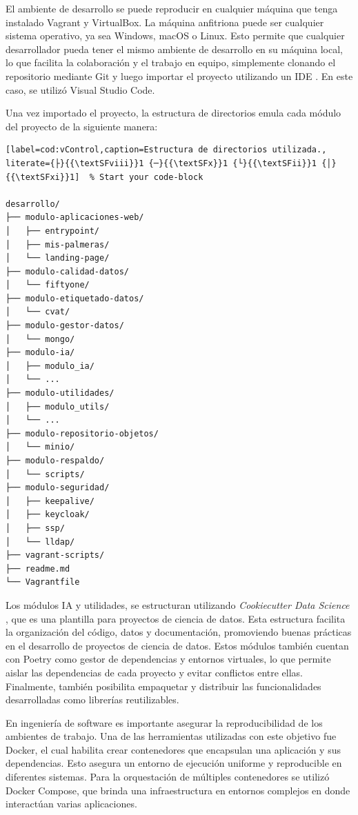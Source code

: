 El ambiente de desarrollo se puede reproducir en cualquier máquina que tenga instalado Vagrant y VirtualBox. La máquina anfitriona puede ser cualquier sistema operativo, ya sea Windows, macOS o Linux. Esto permite que cualquier desarrollador pueda tener el mismo ambiente de desarrollo en su máquina local, lo que facilita la colaboración y el trabajo en equipo, simplemente clonando el repositorio \citep{bruno_masoller_brunomaso1uba-ceia_nodate} mediante Git y luego importar el proyecto utilizando un IDE \citep{wikipedia_entorno_2025}. En este caso, se utilizó Visual Studio Code.

Una vez importado el proyecto, la estructura de directorios emula cada módulo del proyecto de la siguiente manera:

\begin{lstlisting}[label=cod:vControl,caption=Estructura de directorios utilizada., literate={├}{{\textSFviii}}1 {─}{{\textSFx}}1 {└}{{\textSFii}}1 {│}{{\textSFxi}}1]  % Start your code-block

desarrollo/
├── modulo-aplicaciones-web/
│   ├── entrypoint/ 
│   ├── mis-palmeras/
│   └── landing-page/
├── modulo-calidad-datos/
│   └── fiftyone/
├── modulo-etiquetado-datos/
│   └── cvat/
├── modulo-gestor-datos/
│   └── mongo/
├── modulo-ia/
│   ├── modulo_ia/
│   └── ...
├── modulo-utilidades/
│   ├── modulo_utils/
│   └── ...
├── modulo-repositorio-objetos/
│   └── minio/
├── modulo-respaldo/
│   └── scripts/
├── modulo-seguridad/
│   ├── keepalive/
│   ├── keycloak/
│   ├── ssp/
│   └── lldap/
├── vagrant-scripts/
├── readme.md
└── Vagrantfile

\end{lstlisting}

Los módulos IA y utilidades, se estructuran utilizando \textit{Cookiecutter Data Science} \citep{drivendata_cookiecutter_nodate}, que es una plantilla para proyectos de ciencia de datos. Esta estructura facilita la organización del código, datos y documentación, promoviendo buenas prácticas en el desarrollo de proyectos de ciencia de datos. Estos módulos también cuentan con Poetry \citep{eustace_poetry_nodate} como gestor de dependencias y entornos virtuales, lo que permite aislar las dependencias de cada proyecto y evitar conflictos entre ellas. Finalmente, también posibilita empaquetar y distribuir las funcionalidades desarrolladas como librerías reutilizables.

En ingeniería de software es importante asegurar la reproducibilidad de los ambientes de trabajo. Una de las herramientas utilizadas con este objetivo fue Docker, el cual habilita crear contenedores que encapsulan una aplicación y sus dependencias. Esto asegura un entorno de ejecución uniforme y reproducible en diferentes sistemas. Para la orquestación de múltiples contenedores se utilizó Docker Compose, que brinda una infraestructura en entornos complejos en donde interactúan varias aplicaciones.

